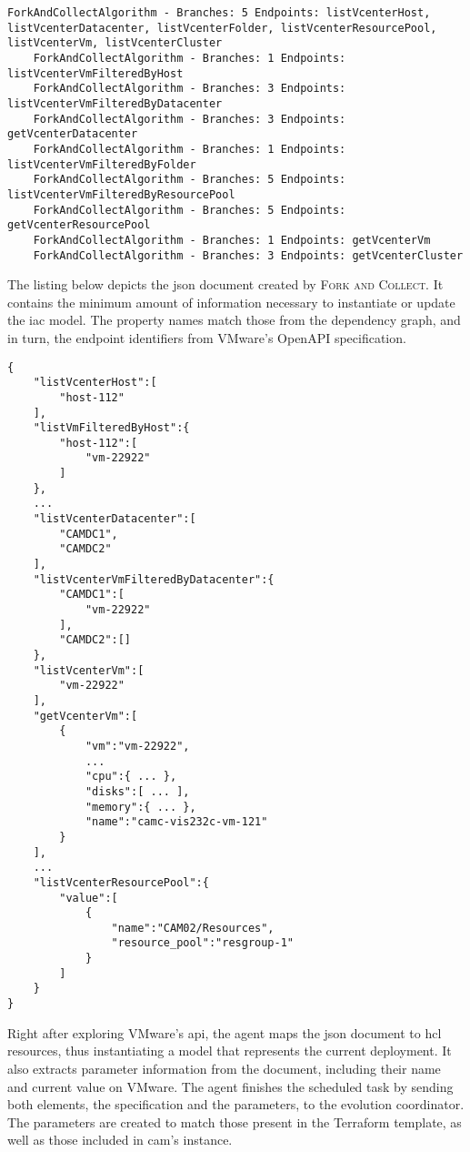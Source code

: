 \begin{mdframed}[style=consolestyle]
	\vspace{0.3em}
	\begin{lstlisting}[style=console]
	ForkAndCollectAlgorithm - Branches: 5 Endpoints: listVcenterHost, listVcenterDatacenter, listVcenterFolder, listVcenterResourcePool, listVcenterVm, listVcenterCluster
	ForkAndCollectAlgorithm - Branches: 1 Endpoints: listVcenterVmFilteredByHost
	ForkAndCollectAlgorithm - Branches: 3 Endpoints: listVcenterVmFilteredByDatacenter
	ForkAndCollectAlgorithm - Branches: 3 Endpoints: getVcenterDatacenter
	ForkAndCollectAlgorithm - Branches: 1 Endpoints: listVcenterVmFilteredByFolder
	ForkAndCollectAlgorithm - Branches: 5 Endpoints: listVcenterVmFilteredByResourcePool
	ForkAndCollectAlgorithm - Branches: 5 Endpoints: getVcenterResourcePool
	ForkAndCollectAlgorithm - Branches: 1 Endpoints: getVcenterVm
	ForkAndCollectAlgorithm - Branches: 3 Endpoints: getVcenterCluster
	\end{lstlisting}
	\vspace{-0.3em}
\end{mdframed}

The listing below depicts the \acrshort{json} document created by \textsc{Fork and Collect}. It contains the minimum amount of information necessary to instantiate or update the \gls{iac} model. The property names match those from the dependency graph, and in turn, the endpoint identifiers from VMware's OpenAPI specification.

\begin{lstlisting}[style=json]
{
	"listVcenterHost":[
		"host-112"
	],
	"listVmFilteredByHost":{
		"host-112":[
			"vm-22922"
		]
	},
	...
	"listVcenterDatacenter":[
		"CAMDC1",
		"CAMDC2"
	],
	"listVcenterVmFilteredByDatacenter":{
		"CAMDC1":[
			"vm-22922"
		],
		"CAMDC2":[]
	},
	"listVcenterVm":[
		"vm-22922"
	],
	"getVcenterVm":[
		{
			"vm":"vm-22922",
			...
			"cpu":{ ... },
			"disks":[ ... ],
			"memory":{ ... },
			"name":"camc-vis232c-vm-121"
		}
	],
	...
	"listVcenterResourcePool":{
		"value":[
			{
				"name":"CAM02/Resources",
				"resource_pool":"resgroup-1"
			}
		]
	}
}
\end{lstlisting}

Right after exploring VMware's \gls{api}, the agent maps the \acrshort{json} document to \gls{hcl} resources, thus instantiating a model that represents the current deployment. It also extracts parameter information from the document, including their name and current value on VMware. The agent finishes the scheduled task by sending both elements, the specification and the parameters, to the evolution coordinator. The parameters are created to match those present in the Terraform template, as well as those included in \gls{cam}'s instance.

